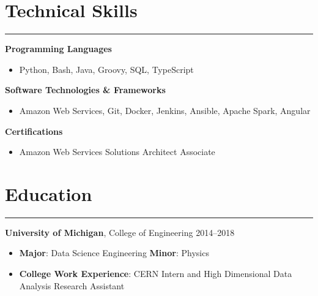 \documentclass[11pt]{article}
\newcommand{\resumesection}[1]{\vspace{-0.5cm}\section*{\LARGE#1}\vspace{-0.2cm}\hrule\vspace{0.2cm}}
\begin{document}
\vspace{0.2cm}
\resumesection{Technical Skills}

\textbf{Programming Languages}
\begin{itemize}
  \item Python, Bash, Java, Groovy, SQL, TypeScript
\end{itemize}

\textbf{Software Technologies \& Frameworks}
\begin{itemize}
  \item{Amazon Web Services, Git, Docker, Jenkins, Ansible, Apache Spark, Angular}
\end{itemize}

\textbf{Certifications}
\begin{itemize}
  \item{Amazon Web Services Solutions Architect Associate}
\end{itemize}

\resumesection{Education}

\textbf{University of Michigan}, College of Engineering \hfill 2014--2018

\begin{itemize}
  \item \textbf{Major}: Data Science Engineering \textbf{Minor}: Physics
  \item \textbf{College Work Experience}: CERN Intern and High Dimensional Data Analysis Research Assistant
\end{itemize}




\end{document}
